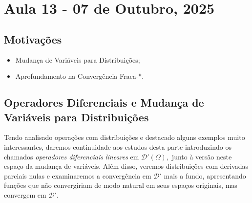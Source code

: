 \documentclass[../distribution_theory_notes.tex]{subfiles}
\begin{document}
\section{Aula 13 - 07 de Outubro, 2025}
\subsection{Motivações}
\begin{itemize}
	\item Mudança de Variáveis para Distribuições;
	\item Aprofundamento na Convergência Fraca-*.
\end{itemize}
\subsection{Operadores Diferenciais e Mudança de Variáveis para Distribuições}
Tendo analisado operações com distribuições e destacado alguns exemplos muito interessantes, daremos continuidade aos estudos desta parte introduzindo os chamados \textit{operadores diferenciais lineares} em \(\mathcal{D}'(\Omega ),\) junto à versão neste espaço da mudança de variáveis. Além disso, veremos distribuições com derivadas
parciais nulas e examinaremos a convergência em \(\mathcal{D}'\) mais a fundo, apresentando funções que não convergiriam de modo natural em seus espaços originais, mas convergem em \(\mathcal{D}'.\)
\end{document}
